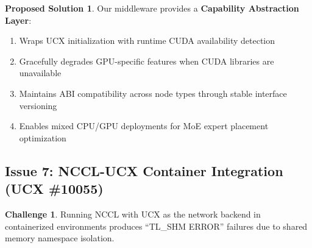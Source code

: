 \documentclass[11pt,letterpaper]{article}
\theoremstyle{definition}
\newtheorem{challenge}{Challenge}
\newtheorem{solution}{Proposed Solution}
\begin{document}
\begin{solution}
Our middleware provides a \textbf{Capability Abstraction Layer}:
\begin{enumerate}
    \item Wraps UCX initialization with runtime CUDA availability detection
    \item Gracefully degrades GPU-specific features when CUDA libraries are unavailable
    \item Maintains ABI compatibility across node types through stable interface versioning
    \item Enables mixed CPU/GPU deployments for MoE expert placement optimization
\end{enumerate}
\end{solution}

\subsection{Issue 7: NCCL-UCX Container Integration (UCX \#10055)}

\begin{challenge}
Running NCCL with UCX as the network backend in containerized environments produces ``TL\_SHM ERROR'' failures due to shared memory namespace isolation.
\end{challenge}
\end{document}
